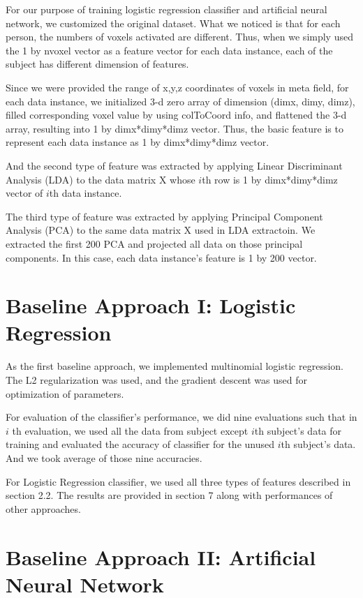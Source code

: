 \documentclass{article} %
\begin{document}
For our purpose of training logistic regression classifier and artificial neural network, we customized the original dataset. What we noticed is that for each person, the numbers of voxels activated are different. Thus, when we simply used the 1 by nvoxel vector as a feature vector for each data instance,   each of the subject has different dimension of features. 

Since we were provided the range of x,y,z coordinates of voxels in meta field, for each data instance, we initialized 3-d zero array of dimension (dimx, dimy, dimz), filled corresponding voxel value by using colToCoord info, and flattened the 3-d array, resulting into 1 by dimx*dimy*dimz vector. Thus, the basic feature is to represent each data instance as 1 by dimx*dimy*dimz vector. 

And the second type of feature was extracted by applying  
Linear Discriminant Analysis (LDA) to the data matrix X whose $i$th row is 1 by dimx*dimy*dimz vector of $i$th data instance.

The third type of feature was extracted by applying Principal Component Analysis (PCA) to the same data matrix X used in LDA extractoin. We extracted the first 200 PCA and projected all data on those principal components. In this case, each data instance's feature is 1 by 200 vector.  
\section{Baseline Approach I: Logistic Regression}

As the first baseline approach, we implemented multinomial logistic regression.  
The L2 regularization was used, and the gradient descent was used for optimization of parameters. 

For evaluation of the classifier's performance, we did nine evaluations such that in $i$ th evaluation, we used all the data from subject except $i$th subject's data for training and evaluated the accuracy of classifier for the unused $i$th subject's data. And we took average of those nine accuracies. 

For Logistic Regression classifier, we used all three types of features described in section 2.2. The results are provided in section 7 along with performances of other approaches. 
\newpage
\section{Baseline Approach II: Artificial Neural Network}
\end{document}
